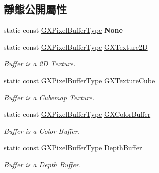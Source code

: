 \subsection*{靜態公開屬性}
\begin{DoxyCompactItemize}
\item 
static const \hyperlink{class_magnum_1_1_g_x_pixel_buffer_type}{G\+X\+Pixel\+Buffer\+Type} {\bfseries None}\hypertarget{class_magnum_1_1_g_x_pixel_buffer_type_a2466150ed1893b6c16fa07ac4955731e}{}\label{class_magnum_1_1_g_x_pixel_buffer_type_a2466150ed1893b6c16fa07ac4955731e}

\item 
static const \hyperlink{class_magnum_1_1_g_x_pixel_buffer_type}{G\+X\+Pixel\+Buffer\+Type} \hyperlink{class_magnum_1_1_g_x_pixel_buffer_type_a1512f0e03595dc9b844767b7ebfd6da9}{G\+X\+Texture2D}\hypertarget{class_magnum_1_1_g_x_pixel_buffer_type_a1512f0e03595dc9b844767b7ebfd6da9}{}\label{class_magnum_1_1_g_x_pixel_buffer_type_a1512f0e03595dc9b844767b7ebfd6da9}

\begin{DoxyCompactList}\small\item\em Buffer is a 2D Texture. \end{DoxyCompactList}\item 
static const \hyperlink{class_magnum_1_1_g_x_pixel_buffer_type}{G\+X\+Pixel\+Buffer\+Type} \hyperlink{class_magnum_1_1_g_x_pixel_buffer_type_a7842966fd7875a67e7f4f0fdac187569}{G\+X\+Texture\+Cube}\hypertarget{class_magnum_1_1_g_x_pixel_buffer_type_a7842966fd7875a67e7f4f0fdac187569}{}\label{class_magnum_1_1_g_x_pixel_buffer_type_a7842966fd7875a67e7f4f0fdac187569}

\begin{DoxyCompactList}\small\item\em Buffer is a Cubemap Texture. \end{DoxyCompactList}\item 
static const \hyperlink{class_magnum_1_1_g_x_pixel_buffer_type}{G\+X\+Pixel\+Buffer\+Type} \hyperlink{class_magnum_1_1_g_x_pixel_buffer_type_a4b61bb8cb69ecdbf39e5171f6608fde2}{G\+X\+Color\+Buffer}\hypertarget{class_magnum_1_1_g_x_pixel_buffer_type_a4b61bb8cb69ecdbf39e5171f6608fde2}{}\label{class_magnum_1_1_g_x_pixel_buffer_type_a4b61bb8cb69ecdbf39e5171f6608fde2}

\begin{DoxyCompactList}\small\item\em Buffer is a Color Buffer. \end{DoxyCompactList}\item 
static const \hyperlink{class_magnum_1_1_g_x_pixel_buffer_type}{G\+X\+Pixel\+Buffer\+Type} \hyperlink{class_magnum_1_1_g_x_pixel_buffer_type_afe093de343db97b9064fec746b2253dc}{Depth\+Buffer}\hypertarget{class_magnum_1_1_g_x_pixel_buffer_type_afe093de343db97b9064fec746b2253dc}{}\label{class_magnum_1_1_g_x_pixel_buffer_type_afe093de343db97b9064fec746b2253dc}

\begin{DoxyCompactList}\small\item\em Buffer is a Depth Buffer. \end{DoxyCompactList}\end{DoxyCompactItemize}


